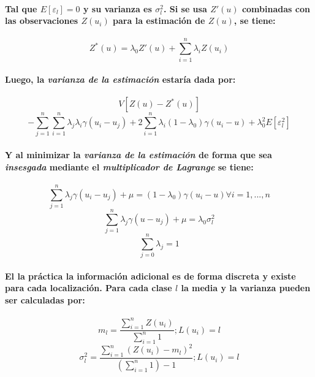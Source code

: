 \paragraph{
Tal que $E[\varepsilon_l] = 0$ y su varianza es $\sigma_l^2$. Si se usa $Z'(u)$ combinadas con las observaciones $Z(u_i)$ para la estimación de $Z(u)$, se tiene:
}
\begin{equation}
Z^*(u) = \lambda_0 Z'(u) + \sum_{i=1}^n \lambda_i Z(u_i)
\end{equation}
\paragraph{
Luego, la \emph{varianza de la estimación} estaría dada por:
}
\begin{equation}
V[Z(u)-Z^*(u)]
\end{equation}
\begin{equation}
- \sum_{j=1}^n \sum_{i=1}^n \lambda_j \lambda_i \gamma(u_i - u_j) + 2 \sum_{i=1}^n \lambda_i (1-\lambda_0) \gamma(u_i - u) + \lambda_0^2 E[\varepsilon_{l}^2]
\end{equation}
\paragraph{
Y al minimizar la \emph{varianza de la estimación} de forma que sea \emph{insesgada} mediante el \emph{multiplicador de Lagrange} se tiene:
}
\begin{equation}
\sum_{j=1}^n \lambda_j \gamma(u_i - u_j) + \mu = (1-\lambda_0)\gamma(u_i-u) \forall i = 1,...,n
\end{equation}
\begin{equation}
\sum_{j=1}^n \lambda_j \gamma(u - u_j) + \mu =  \lambda_0 \sigma_{l}^2
\end{equation}
\begin{equation}
\sum_{j=0}^n \lambda_j = 1
\end{equation}
\paragraph{
El la práctica la información adicional es de forma discreta y existe para cada localización. Para cada clase $l$ la media y la varianza pueden ser calculadas por:
}
\begin{equation}
m_l = \frac{\sum_{i=1}^n Z(u_i)}{\sum_{i=1}^n 1} ; L(u_i) = l
\end{equation}
\begin{equation}
\sigma_l^2 = \frac{\sum_{i=1}^n (Z(u_i)-m_l)^2}{(\sum_{i=1}^n 1)-1}; L(u_i) = l
\end{equation}



